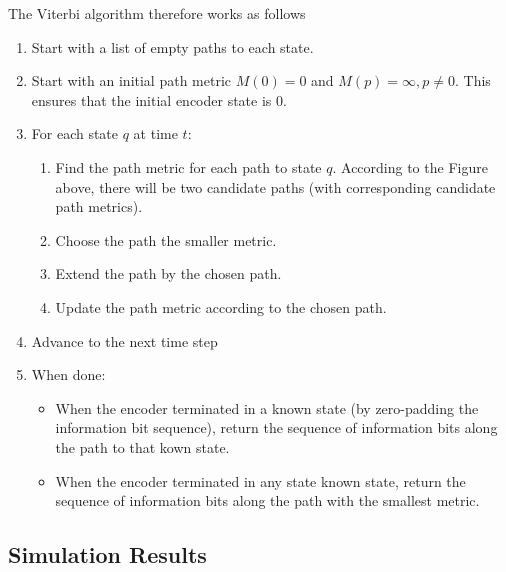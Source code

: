 The Viterbi algorithm therefore works as follows

\begin{enumerate}

\item Start with a list of empty paths to each state.

\item Start with an initial path metric $M(0) = 0$ and $M(p) = \infty, p \neq 0$. This ensures that the initial encoder state is $0$.

\item For each state $q$ at time $t$:

	\begin{enumerate}

		\item Find the path metric for each path to state $q$. According to the Figure above, there will be two candidate paths (with corresponding candidate path metrics).

		\item Choose the path the smaller metric.

		\item Extend the path by the chosen path.

		\item Update the path metric according to the chosen path.

	\end{enumerate}

\item Advance to the next time step

\item When done:

	\begin{itemize}

		\item When the encoder terminated in a known state (by zero-padding the information bit sequence), return the sequence of information bits along the path to that kown state.

		\item When the encoder terminated in any state known state, return the sequence of information bits along the path with the smallest metric.

	\end{itemize}

\end{enumerate}


\subsection{Simulation Results}


